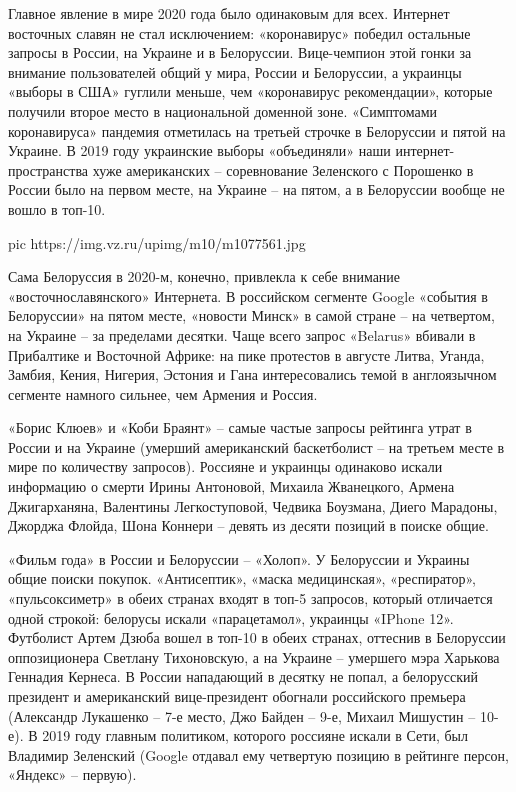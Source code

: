 Главное явление в мире 2020 года было одинаковым для всех. Интернет восточных
славян не стал исключением: «коронавирус» победил остальные запросы в России,
на Украине и в Белоруссии. Вице-чемпион этой гонки за внимание пользователей
общий у мира, России и Белоруссии, а украинцы «выборы в США» гуглили меньше,
чем «коронавирус рекомендации», которые получили второе место в национальной
доменной зоне. «Симптомами коронавируса» пандемия отметилась на третьей строчке
в Белоруссии и пятой на Украине. В 2019 году украинские выборы «объединяли»
наши интернет-пространства хуже американских – соревнование Зеленского с
Порошенко в России было на первом месте, на Украине – на пятом, а в Белоруссии
вообще не вошло в топ-10. 

\ifcmt
pic https://img.vz.ru/upimg/m10/m1077561.jpg
\fi

Сама Белоруссия в 2020-м, конечно, привлекла к себе внимание
«восточнославянского» Интернета. В российском сегменте Google «события в
Белоруссии» на пятом месте, «новости Минск» в самой стране – на четвертом, на
Украине – за пределами десятки. Чаще всего запрос «Belarus» вбивали в
Прибалтике и Восточной Африке: на пике протестов в августе Литва, Уганда,
Замбия, Кения, Нигерия, Эстония и Гана интересовались темой в англоязычном
сегменте намного сильнее, чем Армения и Россия.

«Борис Клюев» и «Коби Браянт» – самые частые запросы рейтинга утрат в России и
на Украине (умерший американский баскетболист – на третьем месте в мире по
количеству запросов). Россияне и украинцы одинаково искали информацию о смерти
Ирины Антоновой, Михаила Жванецкого, Армена Джигарханяна, Валентины
Легкоступовой, Чедвика Боузмана, Диего Марадоны, Джорджа Флойда, Шона Коннери –
девять из десяти позиций в поиске общие. 

«Фильм года» в России и Белоруссии – «Холоп». У Белоруссии и Украины общие
поиски покупок. «Антисептик», «маска медицинская», «респиратор»,
«пульсоксиметр» в обеих странах входят в топ-5 запросов, который отличается
одной строкой: белорусы искали «парацетамол», украинцы «IPhone 12». Футболист
Артем Дзюба вошел в топ-10 в обеих странах, оттеснив в Белоруссии оппозиционера
Светлану Тихоновскую, а на Украине – умершего мэра Харькова Геннадия Кернеса. В
России нападающий в десятку не попал, а белорусский президент и американский
вице-президент обогнали российского премьера (Александр Лукашенко – 7-е место,
Джо Байден – 9-е, Михаил Мишустин – 10-е). В 2019 году главным политиком,
которого россияне искали в Сети, был Владимир Зеленский (Google отдавал ему
четвертую позицию в рейтинге персон, «Яндекс» – первую).

